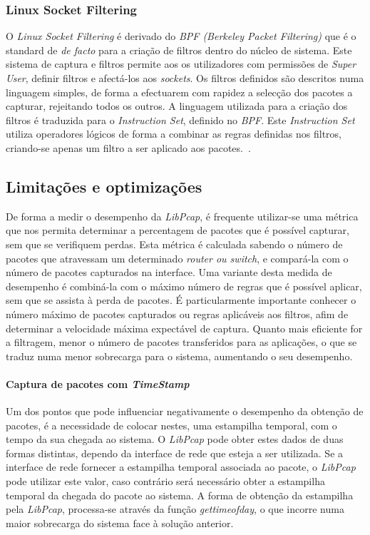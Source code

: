 \subsubsection{Linux Socket Filtering}
O \textit{Linux Socket Filtering} é derivado do \textit{BPF (Berkeley Packet Filtering)} que é o standard de \textit{de facto} para a criação de filtros dentro do núcleo de sistema. 
Este sistema de captura e filtros permite aos os utilizadores com permissões de \textit{Super User}, definir filtros e afectá-los aos \textit{sockets}.
Os filtros definidos são descritos numa linguagem simples, de forma a efectuarem com rapidez a selecção dos pacotes a capturar, rejeitando todos os outros.
A linguagem utilizada para a criação dos filtros é traduzida para o \textit{Instruction Set}, definido no \textit{BPF}.
Este \textit{Instruction Set} utiliza operadores lógicos de forma a combinar as regras definidas nos filtros, criando-se apenas um filtro a ser aplicado aos pacotes.~\cite{Mccanne92thebsd}.

\subsection{Limitações e optimizações}
De forma a medir o desempenho da \textit{LibPcap}, é frequente utilizar-se uma métrica que nos permita determinar a percentagem de pacotes que é possível capturar, sem que se verifiquem perdas.
Esta métrica é calculada sabendo o número de pacotes que atravessam um determinado \textit{router ou switch}, e compará-la com o número de pacotes capturados na interface.
Uma variante desta medida de desempenho é combiná-la com o máximo número de regras que é possível aplicar, sem que se assista à perda de pacotes.
É particularmente importante conhecer o número máximo de pacotes capturados ou regras aplicáveis aos filtros, afim de determinar a velocidade máxima expectável de captura.
Quanto mais eficiente for a filtragem, menor o número de pacotes transferidos para as aplicações, o que se traduz numa menor sobrecarga para o sistema, aumentando o seu desempenho.

\paragraph{Captura de pacotes com \textit{TimeStamp}}
Um dos pontos que pode influenciar negativamente o desempenho da obtenção de pacotes, é a necessidade de colocar nestes, uma estampilha temporal, com o tempo da sua chegada ao sistema.
O \textit{LibPcap} pode obter estes dados de duas formas distintas, dependo da interface de rede que esteja a ser utilizada.
Se a interface de rede fornecer a estampilha temporal associada ao pacote, o \textit{LibPcap} pode utilizar este valor, caso contrário será necessário obter a estampilha temporal da chegada do pacote ao sistema.
A forma de obtenção da estampilha pela \textit{LibPcap}, processa-se através da função \textit{gettimeofday}, o que incorre numa maior sobrecarga do sistema face à solução anterior.

